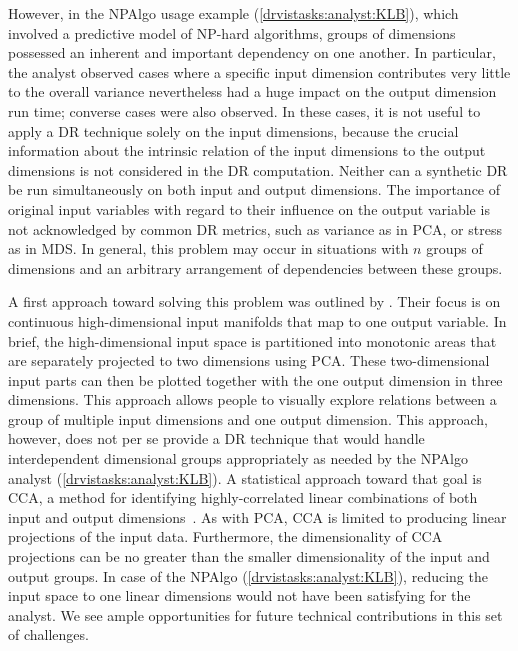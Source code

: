 However, in the {\sc NPAlgo} usage example (\ref{drvistasks:analyst:KLB}), which involved a predictive model of NP-hard algorithms, groups of dimensions possessed an inherent and important dependency on one another.
In particular, the analyst observed cases where a specific input dimension contributes very little to the overall variance nevertheless had a huge impact on the output dimension run time; converse cases were also observed. 
In these cases, it is not useful to apply a \ac{DR} technique solely on the input dimensions, because the crucial information about the intrinsic relation of the input dimensions to the output dimensions is not considered in the \ac{DR} computation. 
Neither can a synthetic \ac{DR} be run simultaneously on both input and output dimensions.
The importance of original input variables with regard to their influence on the output variable is not acknowledged by common \ac{DR} metrics, such as variance as in \ac{PCA}, or stress as in \ac{MDS}. 
In general, this problem may occur in situations with $n$ groups of dimensions and an arbitrary arrangement of dependencies between these groups. 

A first approach toward solving this problem was outlined by \citet{Gerber2009}. Their focus is on continuous high-dimensional input manifolds that map to one output variable. 
In brief, the high-dimensional input space is partitioned into monotonic areas that are separately projected to two dimensions using \ac{PCA}. 
These two-dimensional input parts can then be plotted together with the one output dimension in three dimensions. 
This approach allows people to visually explore relations between a group of multiple input dimensions and one output dimension. 
This approach, however, does not per se provide a \ac{DR} technique that would handle interdependent dimensional groups appropriately as needed by the {\sc NPAlgo} analyst (\ref{drvistasks:analyst:KLB}). 
A statistical approach toward that goal is \ac{CCA}, a method for identifying highly-correlated linear combinations of both input and output dimensions~\cite{Hotelling1936}. 
As with \ac{PCA}, \ac{CCA} is limited to producing linear projections of the input data.
Furthermore, the dimensionality of \ac{CCA} projections can be no greater than the smaller dimensionality of the input and output groups. 
In case of the {\sc NPAlgo} (\ref{drvistasks:analyst:KLB}), reducing the input space to one linear dimensions would not have been satisfying for the analyst. 
We see ample opportunities for future technical contributions in this set of challenges. 

